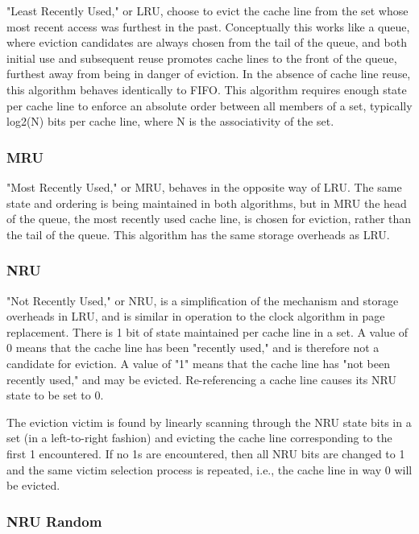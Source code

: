 "Least Recently Used," or LRU, choose to evict the cache line from the set whose most recent access was furthest in the past.  Conceptually this works like a queue, where eviction candidates are always chosen from the tail of the queue, and both initial use and subsequent reuse promotes cache lines to the front of the queue, furthest away from being in danger of eviction. In the absence of cache line reuse, this algorithm behaves identically to FIFO.  This algorithm requires enough state per cache line to enforce an absolute order between all members of a set, typically log2(N) bits per cache line, where N is the associativity of the set.

\subsubsection{MRU}

"Most Recently Used," or MRU, behaves in the opposite way of LRU.  The same state and ordering is being maintained in both algorithms, but in MRU the head of the queue, the most recently used cache line, is chosen for eviction, rather than the tail of the queue.  This algorithm has the same storage overheads as LRU.

\subsubsection{NRU}

"Not Recently Used," or NRU, is a simplification of the mechanism and storage overheads in LRU, and is similar in operation to the clock algorithm in page replacement.  There is 1 bit of state maintained per cache line in a set.  A value of 0 means that the cache line has been "recently used," and is therefore not a candidate for eviction.  A value of "1" means that the cache line has "not been recently used," and may be evicted.  Re-referencing a cache line causes its NRU state to be set to 0.

The eviction victim is found by linearly scanning through the NRU state bits in a set (in a left-to-right fashion) and evicting the cache line corresponding to the first 1 encountered.  If no 1s are encountered, then all NRU bits are changed to 1 and the same victim selection process is repeated, i.e., the cache line in way 0 will be evicted.

\subsubsection{NRU Random}

